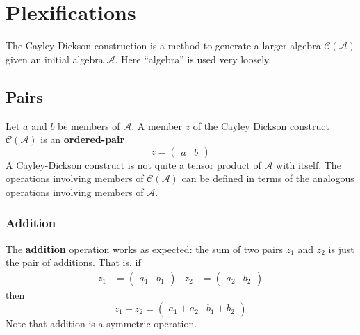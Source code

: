 \chapter{Plexifications}
The Cayley-Dickson construction is a method to generate a larger algebra $\mathcal{C}(\mathcal{A})$ given an initial algebra $\mathcal{A}$. Here ``algebra'' is used very loosely.
\section{Pairs}
Let $a$ and $b$ be members of $\mathcal{A}$. A member $z$ of the Cayley Dickson construct $\mathcal{C}(\mathcal{A})$ is an \textbf{ordered-pair}
\begin{equation}
    z = \begin{pmatrix}
        a & b
    \end{pmatrix}
\end{equation}
A Cayley-Dickson construct is not quite a tensor product of $\mathcal{A}$ with itself. The operations involving members of $\mathcal{C}(\mathcal{A})$ can be defined in terms of the analogous operations involving members of $\mathcal{A}$.
\subsection{Addition}
The \textbf{addition} operation works as expected: the sum of two pairs $z_{1}$ and $z_{2}$ is just the pair of additions. That is, if
\begin{align*}
    z_{1} &= \begin{pmatrix}
        a_{1} & b_{1}
    \end{pmatrix} &
    z_{2} &= \begin{pmatrix}
        a_{2} & b_{2}
    \end{pmatrix}
\end{align*}
then
\begin{equation}
    z_{1} + z_{2} = \begin{pmatrix}
        a_{1} + a_{2} & b_{1} + b_{2}
    \end{pmatrix}
\end{equation}
Note that addition is a symmetric operation.
